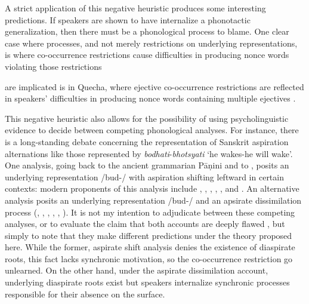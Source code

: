 A strict application of this negative heuristic produces some interesting predictions. If speakers are shown to have internalize a phonotactic generalization, then there must be a phonological process to blame. One clear case where processes, and not merely restrictions on underlying representations, 
is where co-occurrence restrictions cause difficulties in producing nonce words violating those restrictions
\citep{Rose2007,GallagherInPress}

are implicated is in Quecha, where ejective co-occurrence restrictions are reflected in speakers' difficulties in producing nonce words containing multiple ejectives \citep{GallagherInPress}. 

This negative heuristic also allows for the possibility of using psycholinguistic evidence to decide between competing phonological analyses. For instance, there is a long-standing debate concerning the representation of Sanskrit aspiration alternations like those represented by \emph{bodhati}-\emph{bhotsyati} `he wakes-he will wake'. One analysis, going back to the ancient grammarian Pāṇini \citep{Sag1974} and to \citet[\S141f.]{Whitney1889}, posits an underlying representation /bud\asp{}-/ with aspiration shifting leftward in certain contexts: modern proponents of this analysis include \citet{Borowsky1983}, \citet[][59f.]{Hoenigswald1965}, \citet{Kaye1985}, \citet{Sag1974,Sag1976} \citet{Schindler1976}, \citet{Stemberger1980}, and \citet[][\S141f.]{Whitney1889}. An alternative analysis posits an underlying representation /b\asp{}ud\asp{}-/ and an apsirate dissimilation process (\citealt{Anderson1970}, \citealt{Hoard1975}, \citealt[\S3.2]{Kiparsky1965}, \citealt{Phelps1973}, \citealt{Phelps1975b}, \citealt[109f.]{Zwicky1965}). It is not my intention to adjudicate between these competing analyses, or to evaluate the claim that both accounts are deeply flawed \citep{Janda1989}, but simply to note that they make different predictions under the theory proposed here. While the former, aspirate shift analysis denies the existence of diaspirate roots, this fact lacks synchronic motivation, so the co-occurrence restriction go unlearned. On the other hand, under the aspirate dissimilation account, underlying diaspirate roots exist but speakers internalize synchronic processes responsible for their absence on the surface. 

